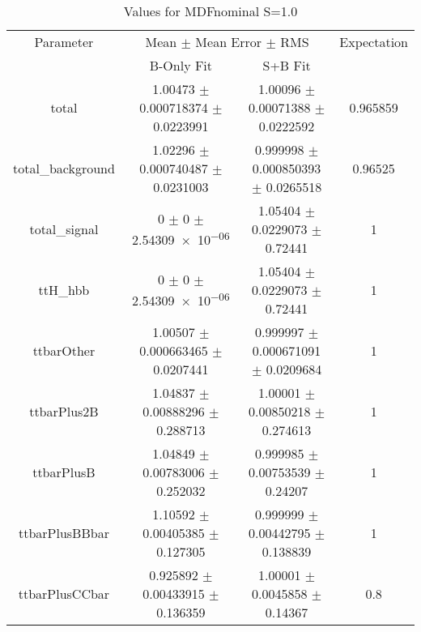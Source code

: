 \begin{table}
\centering
\caption{Values for MDFnominal S=1.0}
\begin{tabular}{cccc}
\toprule
Parameter & \multicolumn{2}{c}{Mean $\pm$ Mean Error $\pm$ RMS} & Expectation\\
 & B-Only Fit & S+B Fit & \\
\midrule
total & \num{1.00473} $\pm$ \num{0.000718374} $\pm$ \num{0.0223991} & \num{1.00096} $\pm$ \num{0.00071388} $\pm$ \num{0.0222592} & \num{0.965859}\\
total\_background & \num{1.02296} $\pm$ \num{0.000740487} $\pm$ \num{0.0231003} & \num{0.999998} $\pm$ \num{0.000850393} $\pm$ \num{0.0265518} & \num{0.96525}\\
total\_signal & \num{0} $\pm$ \num{0} $\pm$ \num{2.54309e-06} & \num{1.05404} $\pm$ \num{0.0229073} $\pm$ \num{0.72441} & \num{1}\\
ttH\_hbb & \num{0} $\pm$ \num{0} $\pm$ \num{2.54309e-06} & \num{1.05404} $\pm$ \num{0.0229073} $\pm$ \num{0.72441} & \num{1}\\
ttbarOther & \num{1.00507} $\pm$ \num{0.000663465} $\pm$ \num{0.0207441} & \num{0.999997} $\pm$ \num{0.000671091} $\pm$ \num{0.0209684} & \num{1}\\
ttbarPlus2B & \num{1.04837} $\pm$ \num{0.00888296} $\pm$ \num{0.288713} & \num{1.00001} $\pm$ \num{0.00850218} $\pm$ \num{0.274613} & \num{1}\\
ttbarPlusB & \num{1.04849} $\pm$ \num{0.00783006} $\pm$ \num{0.252032} & \num{0.999985} $\pm$ \num{0.00753539} $\pm$ \num{0.24207} & \num{1}\\
ttbarPlusBBbar & \num{1.10592} $\pm$ \num{0.00405385} $\pm$ \num{0.127305} & \num{0.999999} $\pm$ \num{0.00442795} $\pm$ \num{0.138839} & \num{1}\\
ttbarPlusCCbar & \num{0.925892} $\pm$ \num{0.00433915} $\pm$ \num{0.136359} & \num{1.00001} $\pm$ \num{0.0045858} $\pm$ \num{0.14367} & \num{0.8}\\
\bottomrule
\end{tabular}
\end{table}